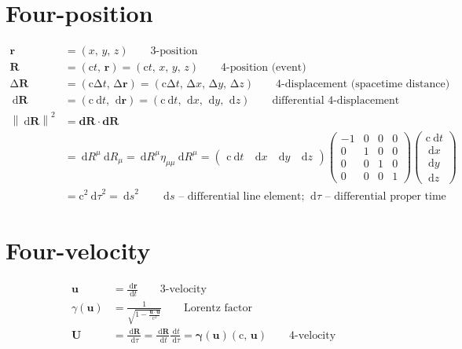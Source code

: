 \documentclass[pagesize,headsepline,10pt,parskip=half]{scrreprt}
\renewcommand\d[1]{\:\textrm{d}#1}
\renewcommand{\vec}[1]{\mathbf{#1}}
\newcommand{\parray}[2]{\left(\begin{array}{#1}#2\end{array}\right)}
\newcommand{\norm}[1]{\left\|{#1}\right\|}
\renewcommand{\c}{\mathrm{c}}
\begin{document}
    \section{Four-position}
      \begin{align*}
        \vec{r} &= \left(x, \, y, \, z\right)  \qquad \text{3-position} \\
        \vec{R} &= \left(\c t, \, \vec{r}\right) = \left(\c t, \, x, \, y, \, z\right) \qquad \text{4-position (event)} \\
        \mathrm{\Delta}{\vec{R}} &= \left(\c \mathrm{\Delta} t, \, \mathrm{\Delta} \vec{r}\right) = \left(\c \mathrm{\Delta} t, \, \mathrm{\Delta} x, \, \mathrm{\Delta} y, \, \mathrm{\Delta} z\right) \qquad \text{4-displacement (spacetime distance)} \\
        \d{\vec{R}} &= \left(\c \d{t}, \, \d{\vec{r}}\right) = \left(\c \d{t}, \, \d{x}, \, \d{y}, \, \d{z}\right) \qquad \text{differential 4-displacement} \\
        {\norm{\d{\vec{R}}}}^2 &= \vec{d{R}} \cdot \vec{dR} \\
        &= \d{R}^\mu \d{R}_\mu = \d{R}^\mu \eta_{\mu\mu} \d{R}^\mu = \parray{cccc}{\c \d{t} & \d{x} &\d{y} & \d{z}} \parray{rrrr}{-1 & 0 & 0 & 0 \\ 0 & 1 & 0 & 0 \\ 0 & 0 & 1 & 0 \\ 0 & 0 & 0 & 1} \parray{c}{\c \d{t} \\ \d{x} \\ \d{y} \\ \d{z}} \\
        &= \c^2 {\d{\tau}}^2 = {\d{s}}^2 \qquad \d{s}\text{ -- differential line element; }\d{\tau}\text{ -- differential proper time}
      \end{align*}

    \section{Four-velocity}
      \begin{align*}
        \vec{u} &= \frac{\d{\vec{r}}}{\d{t}} \qquad \text{3-velocity} \\
        \gamma\left(\vec{u}\right) &= \frac{1}{\sqrt{1 {-} \frac{\vec{u} \cdot \vec{u}}{\c^2}}} \qquad \text{Lorentz factor} \\
        \vec{U} &= \frac{\d{\vec{R}}}{\d{\tau}} = \frac{\d{\vec{R}}}{\d{t}} \frac{\d{t}}{\d{\tau}} = \vec{\gamma}\left(\vec{u}\right) \left(\c, \, \vec{u}\right) \qquad \text{4-velocity}
      \end{align*}
\end{document}
